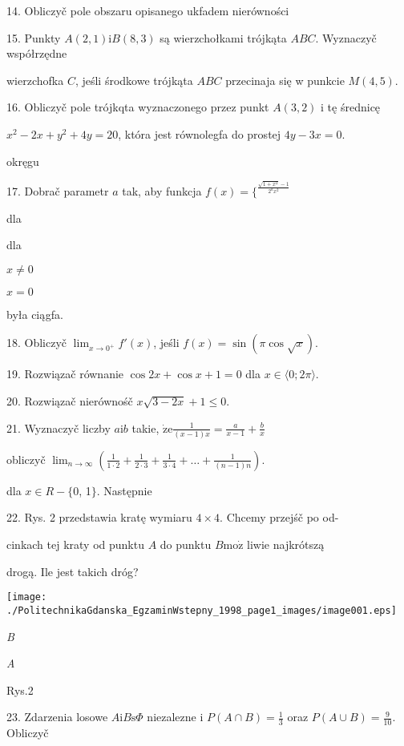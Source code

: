 \documentclass[a4paper,12pt]{article}
\begin{document}
14. Obliczyč pole obszaru opisanego ukfadem nierówności 

15. Punkty $A(2,1) \mathrm{i} B(8,3)$ są wierzchołkami trójkąta $ABC$. Wyznaczyč współrzędne

wierzchofka $C$, jeśli środkowe trójkąta $ABC$ przecinaja się w punkcie $M(4,5).$

16. Obliczyč pole trójkqta wyznaczonego przez punkt $A(3,2)$ i tę średnicę

$x^{2}-2x+y^{2}+4y=20$, która jest równolegfa do prostej $4y-3x=0.$

okręgu

17. Dobrač parametr $a$ tak, aby funkcja $f(x)=\{^{\frac{\sqrt{1+x^{2}}-1}{2^{a}x^{2}}}$

dla

dla

$x\neq 0$

$x=0$

była ciągfa.

18. Obliczyč $\displaystyle \lim_{x\rightarrow 0^{+}}f'(x)$, jeśli $f(x)=\sin(\pi\cos\sqrt{x}).$

19. Rozwiązač równanie $\cos 2x+\cos x+1=0$ dla $x\in\langle 0;2\pi\rangle.$

20. Rozwiązač nierównośč $x\sqrt{3-2x}+1\leq 0.$

21. Wyznaczyč liczby $a\mathrm{i}b$ takie, $\dot{\mathrm{z}}\mathrm{e} \displaystyle \frac{1}{(x-1)x}=\frac{a}{x-1}+\frac{b}{x}$

obliczyč $\displaystyle \lim_{n\rightarrow\infty}(\frac{1}{1\cdot 2}+\frac{1}{2\cdot 3}+\frac{1}{3\cdot 4}+\ldots+\frac{1}{(n-1)n}).$

dla $x\in R-\{0$, 1$\}$. Następnie

22. Rys. 2 przedstawia kratę wymiaru $4\times 4$. Chcemy przejśč po od-

cinkach tej kraty od punktu $A$ do punktu $B\mathrm{m}\mathrm{o}\dot{\mathrm{z}}$ liwie najkrótszą

drogą. Ile jest takich dróg?
\begin{center}
\texttt{[image: ./PolitechnikaGdanska\_EgzaminWstepny\_1998\_page1\_images/image001.eps]}
\end{center}
{\it B}

{\it A}

Rys.2

23. Zdarzenia losowe $ A\mathrm{i}B\mathrm{s}\Phi$ niezalezne i $P(A\displaystyle \cap B)=\frac{1}{3}$ oraz $P(A\displaystyle \cup B)=\frac{9}{10}$. Obliczyč
\end{document}
